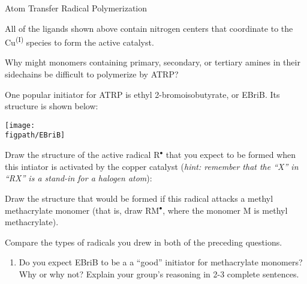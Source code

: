 \begin{activity}{Atom Transfer Radical Polymerization}
\begin{ctqs}
		\begin{solution}[1.25in]
		\end{solution}
	
	\question All of the ligands shown above contain nitrogen centers that coordinate to the Cu\textsuperscript{(I)} species to form the active catalyst.
	
		Why might monomers containing primary, secondary, or tertiary amines in their sidechains be difficult to polymerize by ATRP?  
	
		\begin{solution}[1.25in]
		\end{solution}
	
\end{ctqs}

\begin{infobox}
	One popular initiator for ATRP is ethyl 2-bromoisobutyrate, or EBriB.  Its structure is shown below:
	
	\centerline{\texttt{[image: \\figpath/EBriB]}}
\end{infobox}

\begin{ctqs}
	\question Draw the structure of the active radical R$^\bullet$ that you expect to be formed when this intiator is activated by the copper catalyst (\emph{hint: remember that the ``X'' in ``RX'' is a stand-in for a halogen atom}):
	
		\begin{solution}[1.5in]
		\end{solution}
	
	\question Draw the structure that would be formed if this radical attacks a methyl methacrylate monomer (that is, draw RM$^\bullet$, where the monomer M is methyl methacrylate).
	
		\begin{solution}[1.5in]
		\end{solution}
	
	\question Compare the types of radicals you drew in both of the preceding questions.
	
		\begin{enumerate}
			\item Do you expect EBriB to be a a ``good'' initiator for methacrylate monomers?  Why or why not?  Explain your group's reasoning in 2-3 complete sentences.
	
			\begin{solution}[1.25in]
			\end{solution}
			

\end{enumerate}
\end{ctqs}
\end{activity}
